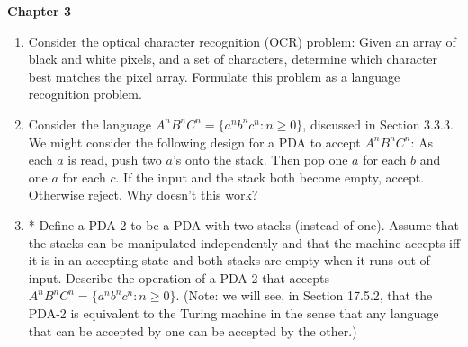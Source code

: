 \documentclass[10pt]{article}
\newcommand{\chtitle}[1]{\noindent \vspace{5mm}\textbf{Chapter #1}\vspace{3mm}}
\begin{document}
\chtitle{3}
\begin{enumerate}
\addtocounter{enumi}{1}


\item
Consider the optical character recognition (OCR) problem: Given an array of black and white pixels, and a set of characters, determine which character best matches the pixel array. Formulate this problem as a language recognition problem.


\item
Consider the language $A^nB^nC^n = \{a^nb^nc^n: n \geq 0\}$, discussed in Section 3.3.3.  We might consider the following design for a PDA to accept $A^nB^nC^n$:  As each $a$ is read, push two $a$'s onto the stack.  Then pop one $a$ for each $b$ and one $a$ for each $c$.  If the input and the stack both become empty, accept.  Otherwise reject.  Why doesn’t this 
work?


\item
* Define a PDA-2 to be a PDA with two stacks (instead of one).  Assume that the stacks can be manipulated independently and that the machine accepts iff it is in an accepting state and both stacks are empty when it runs out of input.  Describe the operation of a PDA-2 that accepts $A^nB^nC^n = \{a^nb^nc^n : n \geq 0\}$.  (Note: we will see, in Section 17.5.2, that the PDA-2 is equivalent to the Turing machine in the sense that any language that can be 
accepted by one can be accepted by the other.)
\end{enumerate}
\end{document}
